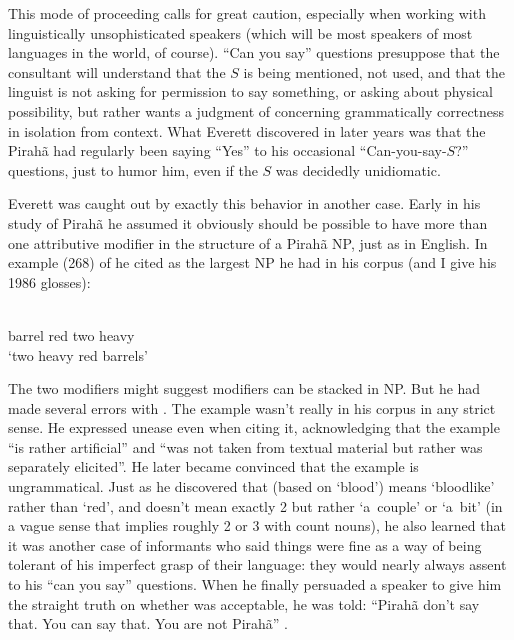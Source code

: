 \documentclass[output=paper,colorlinks,citecolor=brown
]{langscibook}
\begin{document}
This mode of proceeding calls for great caution, especially when
working with linguistically unsophisticated speakers (which will be
most speakers of most languages in the world, of course). ``Can you say''
questions presuppose that the consultant will understand that the $S$
is being mentioned, not used, and that the linguist is not asking
for permission to say something, or asking about physical possibility,
but rather wants a judgment of concerning grammatically correctness
in isolation from context. What Everett discovered in later years was
that the Pirah{\~a} had regularly been saying ``Yes'' to his occasional
``Can-you-say-$S$?'' questions, just to humor him, even if the $S$ was
decidedly unidiomatic.

Everett was caught out by exactly this behavior in another case. Early
in his study of Pirah{\~a} he assumed it obviously should be possible
to have more than one attributive modifier in the structure of a
Pirah{\~a} NP, just as in English. In example (268) of \citet[273]{Everett86HAL} he cited  as the largest NP he had
in his corpus (and I give his 1986 glosses):

\ea\label{ex:pullum:4}
\gll {}     
      \\
     barrel   red   two   heavy \\
     \glt `two heavy red barrels'
\z

\noindent
The two modifiers might suggest modifiers can be stacked in NP. But
he had made several errors with . The example wasn't really
in his corpus in any strict sense. He expressed unease even when citing
it, acknowledging that the example ``is rather artificial'' and ``was
not taken from textual material but rather was separately elicited''.
He later became convinced that the example is ungrammatical. Just
as he discovered that  (based on 
`blood') means `bloodlike' rather than `red', and 
doesn't mean exactly 2 but rather `a~couple' or `a~bit' (in a vague
sense that implies roughly 2 or 3 with count nouns), he also learned
that it was another case of informants who said things were fine as
a way of being tolerant of his imperfect grasp of their language:
they would nearly always assent to his ``can you say'' questions. When
he finally persuaded a speaker to give him the straight truth on
whether  was acceptable, he was told: ``Pirah{\~a} don't
say that.  You can say that. You are not Pirah{\~a}''
\citep[422]{Everett09}.
\end{document}
